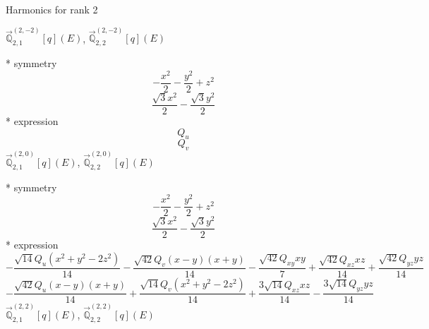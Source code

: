 \documentclass[fleqn,8pt]{jsarticle}
\begin{document}
\noindent * Harmonics for rank 2

\noindent\quad $\vec{\mathbb{Q}}_{2,1}^{(2,-2)}[q](E)$, $\vec{\mathbb{Q}}_{2,2}^{(2,-2)}[q](E)$

\noindent\quad ** symmetry
\begin{dmath*}
- \frac{x^{2}}{2} - \frac{y^{2}}{2} + z^{2}
\end{dmath*}
\begin{dmath*}
\frac{\sqrt{3} x^{2}}{2} - \frac{\sqrt{3} y^{2}}{2}
\end{dmath*}
\noindent\quad ** expression
\begin{dmath*}
Q_{u}
\end{dmath*}
\begin{dmath*}
Q_{v}
\end{dmath*}
\noindent\quad $\vec{\mathbb{Q}}_{2,1}^{(2,0)}[q](E)$, $\vec{\mathbb{Q}}_{2,2}^{(2,0)}[q](E)$

\noindent\quad ** symmetry
\begin{dmath*}
- \frac{x^{2}}{2} - \frac{y^{2}}{2} + z^{2}
\end{dmath*}
\begin{dmath*}
\frac{\sqrt{3} x^{2}}{2} - \frac{\sqrt{3} y^{2}}{2}
\end{dmath*}
\noindent\quad ** expression
\begin{dmath*}
- \frac{\sqrt{14} Q_{u} \left(x^{2} + y^{2} - 2 z^{2}\right)}{14} - \frac{\sqrt{42} Q_{v} \left(x - y\right) \left(x + y\right)}{14} - \frac{\sqrt{42} Q_{xy} x y}{7} + \frac{\sqrt{42} Q_{xz} x z}{14} + \frac{\sqrt{42} Q_{yz} y z}{14}
\end{dmath*}
\begin{dmath*}
- \frac{\sqrt{42} Q_{u} \left(x - y\right) \left(x + y\right)}{14} + \frac{\sqrt{14} Q_{v} \left(x^{2} + y^{2} - 2 z^{2}\right)}{14} + \frac{3 \sqrt{14} Q_{xz} x z}{14} - \frac{3 \sqrt{14} Q_{yz} y z}{14}
\end{dmath*}
\noindent\quad $\vec{\mathbb{Q}}_{2,1}^{(2,2)}[q](E)$, $\vec{\mathbb{Q}}_{2,2}^{(2,2)}[q](E)$
\end{document}
